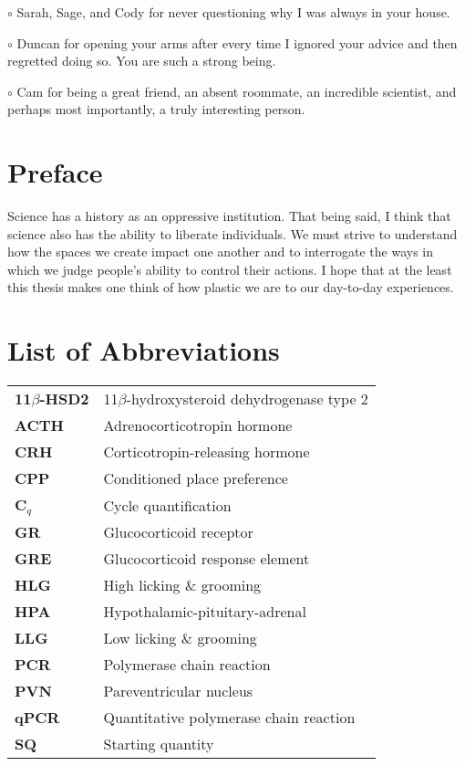 \documentclass[12pt,twoside]{reedthesis}
\begin{document}
$\circ$ Sarah, Sage, and Cody for never questioning why I was always in your house.

$\circ$ Duncan for opening your arms after every time I ignored your advice and then regretted doing so. You are such a strong being.

 $\circ$ Cam for being a great friend, an absent roommate, an incredible scientist, and perhaps most importantly, a truly interesting person.
	

    \chapter*{Preface}
	Science has a history as an oppressive institution. That being said, I think
  that science also has the ability to liberate individuals. We must strive to understand how
the spaces we create impact one another and to interrogate the ways in which we
judge people's ability to control their actions. I hope that at the
  least this thesis makes one think of how plastic we are to our day-to-day experiences.

    \chapter*{List of Abbreviations}

	\begin{table}[h]
	\centering %
	\begin{tabular}{ll}
    \textbf{11$\beta$-HSD2} & 11$\beta$-hydroxysteroid dehydrogenase type 2\\
    \textbf{ACTH} & Adrenocorticotropin hormone\\
    \textbf{CRH} & Corticotropin-releasing hormone \\
    \textbf{CPP} & Conditioned place preference\\
    \textbf{C$_q$} & Cycle quantification \\
    \textbf{GR} & Glucocorticoid receptor \\
    \textbf{GRE} & Glucocorticoid response element \\
    \textbf{HLG} & High licking \& grooming \\
    \textbf{HPA} & Hypothalamic-pituitary-adrenal \\
    \textbf{LLG} & Low licking \& grooming \\
    \textbf{PCR} & Polymerase chain reaction\\
    \textbf{PVN} & Pareventricular nucleus \\
    \textbf{qPCR} & Quantitative polymerase chain reaction\\
    \textbf{SQ} & Starting quantity \\
   	\end{tabular}
	\end{table}
\end{document}
